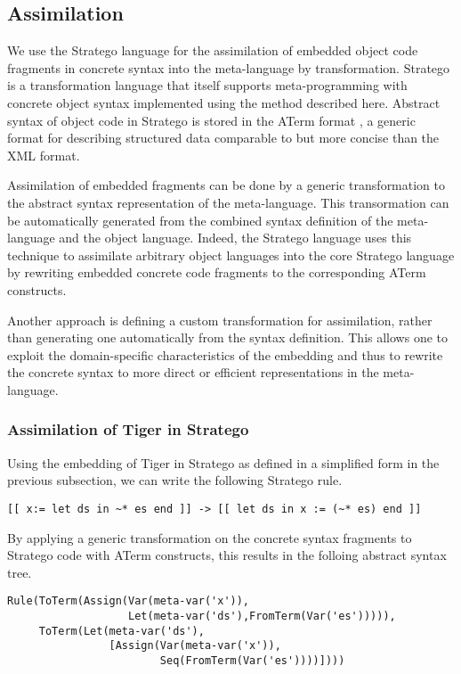 \documentclass[a4paper,11pt]{article}
\begin{document}
\subsection{Assimilation}

We use the Stratego language for the assimilation of embedded object code fragments
in concrete syntax into the meta-language by transformation. Stratego is a
transformation language that itself supports meta-programming with concrete object
syntax implemented using the method described here. Abstract syntax of object code
in Stratego is stored in the ATerm format \cite{Brand00}, a generic format for describing
structured data comparable to but more concise than the XML format.

Assimilation of embedded fragments can be done by a generic transformation to the
abstract syntax representation of the meta-language. This transormation can be
automatically generated from the combined syntax definition of the meta-language
and the object language. Indeed, the Stratego language uses this technique to
assimilate arbitrary object languages into the core Stratego language by rewriting
embedded concrete code fragments to the corresponding ATerm constructs.

Another approach is defining a custom transformation for assimilation, rather than
generating one automatically from the syntax definition. This allows one to exploit
the domain-specific characteristics of the embedding and thus to rewrite the
concrete syntax to more direct or efficient representations in the meta-language.

\subsubsection*{Assimilation of Tiger in Stratego}

Using the embedding of Tiger in Stratego as defined in a simplified form in the
previous subsection, we can write the following Stratego rule.
\begin{lstlisting}[title=Program fragment of Tiger in Stratego]
[[ x:= let ds in ~* es end ]] -> [[ let ds in x := (~* es) end ]]
\end{lstlisting}
By applying a generic transformation on the concrete syntax fragments to Stratego
code with ATerm constructs, this results in the folloing abstract syntax tree.
\begin{lstlisting}[title=Translated program fragment of tiger in Stratego]
Rule(ToTerm(Assign(Var(meta-var('x')),
                   Let(meta-var('ds'),FromTerm(Var('es'))))),
     ToTerm(Let(meta-var('ds'),
                [Assign(Var(meta-var('x')),
                        Seq(FromTerm(Var('es'))))])))
\end{lstlisting}
\end{document}
